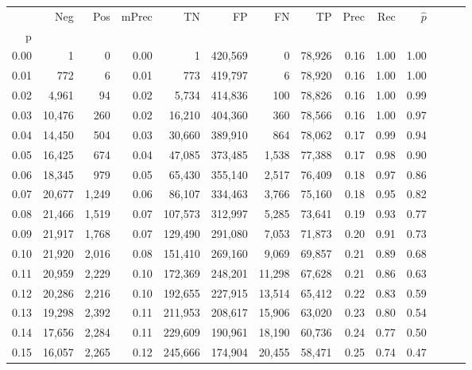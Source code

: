 \begin{tabular}{rrrrrrrrrrrrrr}
\toprule
{} &     Neg &    Pos & mPrec &       TN &       FP &      FN &      TP &  Prec &   Rec & $\hat{p}$ \\
p    &         &        &       &          &          &         &         &       &       &           \\
\midrule
0.00 &       1 &      0 &  0.00 &        1 &  420,569 &       0 &  78,926 &  0.16 &  1.00 &      1.00 \\
0.01 &     772 &      6 &  0.01 &      773 &  419,797 &       6 &  78,920 &  0.16 &  1.00 &      1.00 \\
0.02 &   4,961 &     94 &  0.02 &    5,734 &  414,836 &     100 &  78,826 &  0.16 &  1.00 &      0.99 \\
0.03 &  10,476 &    260 &  0.02 &   16,210 &  404,360 &     360 &  78,566 &  0.16 &  1.00 &      0.97 \\
0.04 &  14,450 &    504 &  0.03 &   30,660 &  389,910 &     864 &  78,062 &  0.17 &  0.99 &      0.94 \\
0.05 &  16,425 &    674 &  0.04 &   47,085 &  373,485 &   1,538 &  77,388 &  0.17 &  0.98 &      0.90 \\
0.06 &  18,345 &    979 &  0.05 &   65,430 &  355,140 &   2,517 &  76,409 &  0.18 &  0.97 &      0.86 \\
0.07 &  20,677 &  1,249 &  0.06 &   86,107 &  334,463 &   3,766 &  75,160 &  0.18 &  0.95 &      0.82 \\
0.08 &  21,466 &  1,519 &  0.07 &  107,573 &  312,997 &   5,285 &  73,641 &  0.19 &  0.93 &      0.77 \\
0.09 &  21,917 &  1,768 &  0.07 &  129,490 &  291,080 &   7,053 &  71,873 &  0.20 &  0.91 &      0.73 \\
0.10 &  21,920 &  2,016 &  0.08 &  151,410 &  269,160 &   9,069 &  69,857 &  0.21 &  0.89 &      0.68 \\
0.11 &  20,959 &  2,229 &  0.10 &  172,369 &  248,201 &  11,298 &  67,628 &  0.21 &  0.86 &      0.63 \\
0.12 &  20,286 &  2,216 &  0.10 &  192,655 &  227,915 &  13,514 &  65,412 &  0.22 &  0.83 &      0.59 \\
0.13 &  19,298 &  2,392 &  0.11 &  211,953 &  208,617 &  15,906 &  63,020 &  0.23 &  0.80 &      0.54 \\
0.14 &  17,656 &  2,284 &  0.11 &  229,609 &  190,961 &  18,190 &  60,736 &  0.24 &  0.77 &      0.50 \\
0.15 &  16,057 &  2,265 &  0.12 &  245,666 &  174,904 &  20,455 &  58,471 &  0.25 &  0.74 &      0.47 \\

\end{tabular}
